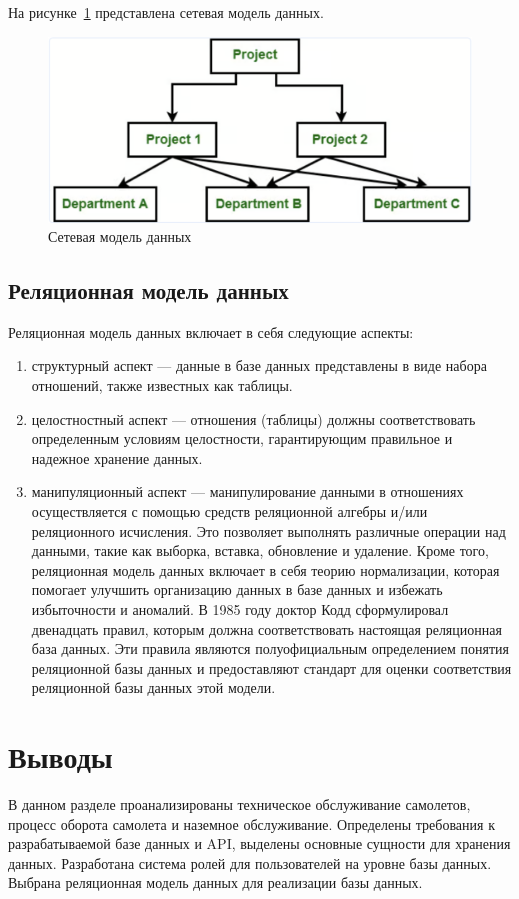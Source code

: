 На рисунке~\ref{fig:network-model} представлена сетевая модель данных.

\begin{figure}[h]
    \begin{center}
        \includegraphics[scale=0.3]{inc/network-model}
        \caption{Сетевая модель данных}
        \label{fig:network-model}
    \end{center}
\end{figure}

\subsection{Реляционная модель данных}
Реляционная модель данных включает в себя следующие аспекты:

\begin{enumerate}[label=\arabic*)]
    \item структурный аспект --- данные в базе данных представлены в виде набора отношений, также известных как таблицы.
    \item целостностный аспект --- отношения (таблицы) должны соответствовать определенным условиям целостности, гарантирующим правильное и надежное хранение данных.
    \item манипуляционный аспект --- манипулирование данными в отношениях осуществляется с помощью средств реляционной алгебры и/или реляционного исчисления.
    Это позволяет выполнять различные операции над данными, такие как выборка, вставка, обновление и удаление.
    Кроме того, реляционная модель данных включает в себя теорию нормализации, которая помогает улучшить организацию данных в базе данных и избежать избыточности и аномалий.
    В 1985 году доктор Кодд сформулировал двенадцать правил, которым должна соответствовать настоящая реляционная база данных.
    Эти правила являются полуофициальным определением понятия реляционной базы данных и предоставляют стандарт для оценки соответствия реляционной базы данных этой модели.
\end{enumerate}


\section*{Выводы}
В данном разделе проанализированы техническое обслуживание самолетов, процесс оборота самолета и наземное обслуживание.
Определены требования к разрабатываемой базе данных и API, выделены основные сущности для хранения данных.
Разработана система ролей для пользователей на уровне базы данных.
Выбрана реляционная модель данных для реализации базы данных.